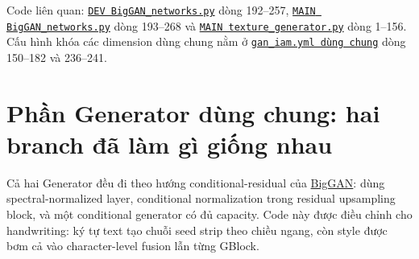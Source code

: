 \documentclass[10pt,a4paper]{article}
\newcommand{\code}[2]{\href{#1}{\texttt{#2}}}
\newcommand{\paper}[2]{\href{#1}{#2}}
\newcommand{\srcmainG}{\code{https://github.com/rquq/HGGAN_test/blob/main/networks/BigGAN_networks.py}{MAIN BigGAN\_networks.py}}
\newcommand{\srcdevG}{\code{https://github.com/rquq/HGGAN_test/blob/dev/networks/BigGAN_networks.py}{DEV BigGAN\_networks.py}}
\newcommand{\srctexture}{\code{https://github.com/rquq/HGGAN_test/blob/main/networks/texture_generator.py}{MAIN texture\_generator.py}}
\newcommand{\srccfg}{\code{https://github.com/rquq/HGGAN_test/blob/dev/configs/gan_iam.yml}{gan\_iam.yml dùng chung}}
\begin{document}
Code liên quan: \srcdevG{} dòng 192--257, \srcmainG{} dòng 193--268 và \srctexture{} dòng 1--156. Cấu hình khóa các dimension dùng chung nằm ở \srccfg{} dòng 150--182 và 236--241.

\section{Phần Generator dùng chung: hai branch đã làm gì giống nhau}

Cả hai Generator đều đi theo hướng conditional-residual của \paper{https://arxiv.org/abs/1809.11096}{BigGAN}: dùng spectral-normalized layer, conditional normalization trong residual upsampling block, và một conditional generator có đủ capacity. Code này được điều chỉnh cho handwriting: ký tự text tạo chuỗi seed strip theo chiều ngang, còn style được bơm cả vào character-level fusion lẫn từng GBlock.
\end{document}
